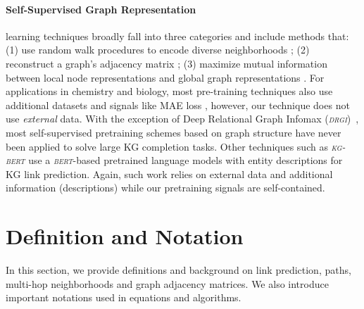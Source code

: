 \documentclass{article}
\newcommand{\drgi}{\textsl{\textsc{drgi}}\xspace}
\newcommand{\kgbert}{\textsl{\textsc{kg-bert}}\xspace}
\newcommand{\bert}{\textsl{\textsc{bert}}\xspace}
\begin{document}
\paragraph{Self-Supervised Graph Representation} learning techniques broadly fall into three categories and include methods that: 
(1) use random walk procedures to encode diverse neighborhoods \cite{deepwalk2014,grover2016node2vec,NIPS2017_5dd9db5e}; 
(2) reconstruct a graph's adjacency matrix \cite{vgae2016,NEURIPS2019_fd4771e8,slaps}; 
(3) maximize mutual information between local node representations and global graph representations \cite{velickovic2018deep,NEURIPS2020_3fe23034,drgi2021}. 
For applications in chemistry and biology, most pre-training techniques also use additional datasets and signals like MAE loss \cite{Hu_2020Strategies,graphormer}, however, our technique does not use \emph{external} data. 
With the exception of Deep Relational Graph Infomax (\drgi)~\cite{drgi2021}, most self-supervised pretraining schemes based on graph structure have never been applied to solve large KG completion tasks. 
Other techniques such as \kgbert \cite{Yao2019KGBERTBF} use a \bert-based \cite{bert} pretrained language models with entity descriptions for KG link prediction. 
Again, such work relies on external data and additional information (descriptions) while our pretraining signals are self-contained.


\section{Definition and Notation}
\label{app:def}

In this section, we provide definitions and background on link prediction, paths, multi-hop neighborhoods and graph adjacency matrices.
We also introduce important notations used in equations and algorithms.
\end{document}

